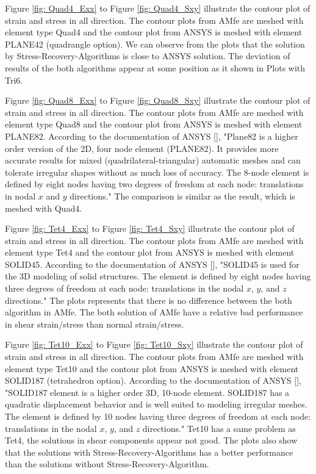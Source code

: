 Figure \ref{fig: Quad4_Exx} to Figure \ref{fig: Quad4_Sxy} illustrate the contour plot of strain and stress in all direction. The contour plots from AMfe are meshed with element type Quad4 and the contour plot from ANSYS is meshed with element PLANE42 (quadrangle option). We can observe from the plots that the solution by Stress-Recovery-Algorithms is close to ANSYS solution. The deviation of results of the both algorithms appear at some position as it shown in Plots with Tri6.  

Figure \ref{fig: Quad8_Exx} to Figure \ref{fig: Quad8_Sxy} illustrate the contour plot of strain and stress in all direction. The contour plots from AMfe are meshed with element type Quad8 and the contour plot from ANSYS is meshed with element PLANE82. According to the documentation of ANSYS [\cite{APDL}], "Plane82 is a higher order version of the 2D, four node element (PLANE82). It provides more accurate results for mixed (quadrilateral-triangular) automatic meshes and can tolerate irregular shapes without as much loss of accuracy. The 8-node element is defined by eight nodes having two degrees of freedom at each node: translations in nodal $x$ and $y$ directions." The comparison is similar as the result, which is meshed with Quad4. 

Figure \ref{fig: Tet4_Exx} to Figure \ref{fig: Tet4_Sxy} illustrate the contour plot of strain and stress in all direction. The contour plots from AMfe are meshed with element type Tet4 and the contour plot from ANSYS is meshed with element SOLID45. According to the documentation of ANSYS [\cite{APDL}], "SOLID45 is used for the 3D modeling of solid structures. The element is defined by eight nodes having three degrees of freedom at each node: translations in the nodal $x$, $y$, and $z$ directions." The plots represents that there is no difference between the both algorithm in AMfe. The both solution of AMfe have a relative bad performance in shear strain/stress than normal strain/stress. 

Figure \ref{fig: Tet10_Exx} to Figure \ref{fig: Tet10_Sxy} illustrate the contour plot of strain and stress in all direction. The contour plots from AMfe are meshed with element type Tet10 and the contour plot from ANSYS is meshed with element SOLID187 (tetrahedron option). According to the documentation of ANSYS [\cite{APDL}], "SOLID187 element is a higher order 3D, 10-node element. SOLID187 has a quadratic displacement behavior and is well suited to modeling irregular meshes. The element is defined by 10 nodes having three degrees of freedom at each node: translations in the nodal $x$, $y$, and $z$ directions." Tet10 has a same problem as Tet4, the solutions in shear components appear not good. The plots also show that the solutions with Stress-Recovery-Algorithms has a better performance than the solutions  without Stress-Recovery-Algorithm. 

